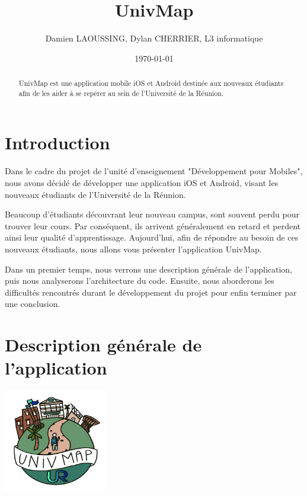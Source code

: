 \documentclass{article}
\title{UnivMap}
\author{Damien LAOUSSING, Dylan CHERRIER, L3 informatique}
\date{\today}
\begin{document}
\maketitle %


\begin{abstract}
  UnivMap est une application mobile iOS et Android destinée aux nouveaux
  étudiants afin de les aider à se repérer au sein de l'Université de la Réunion.
\end{abstract}


\section{Introduction}
\label{section:intro} %

Dans le cadre du projet de l'unité d'enseignement "Développement pour Mobiles", nous avons décidé de développer
une application iOS et Android, visant les nouveaux étudiants de l'Université de la Réunion.

Beaucoup d'étudiants découvrant leur nouveau campus, sont souvent perdu pour trouver leur cours. Par conséquent,
ils arrivent généralement en retard et perdent ainsi leur qualité d'apprentissage.
Aujourd'hui, afin de répondre au besoin de ces nouveaux étudiants, nous allons vous présenter l'application UnivMap.

Dans un premier temps, nous verrons une description générale de l'application, puis nous analyserons
l'architecture du code. Ensuite, nous aborderons les difficultés rencontrés durant le développement
du projet pour enfin terminer par une conclusion.

\section{Description générale de l'application}


\begin{center}
    \includegraphics[width=45mm, scale=0.5]{UnivMap-logo500x500.png}
\end{center}
\end{document}
